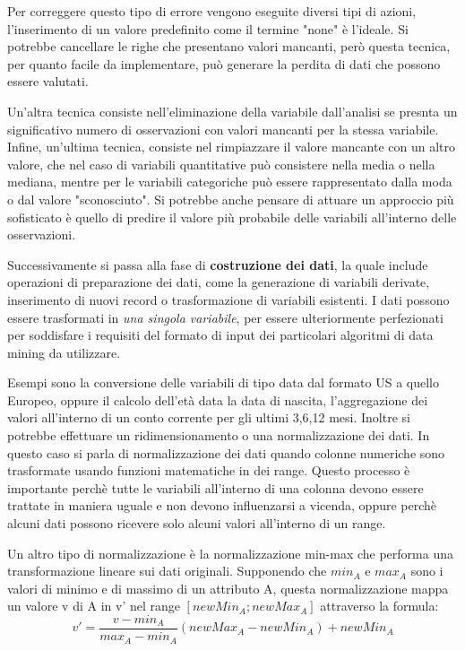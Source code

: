 \documentclass[a4paper]{extarticle}
\begin{document}
Per correggere questo tipo di errore vengono eseguite diversi tipi di azioni, l'inserimento di un valore predefinito come il termine "none" è l'ideale. Si potrebbe cancellare le righe che presentano valori mancanti, però questa tecnica, per quanto facile da implementare, può generare la perdita di dati che possono essere valutati. 

Un'altra tecnica consiste nell'eliminazione della variabile dall'analisi se presnta un significativo numero di osservazioni con valori mancanti per la stessa variabile. Infine, un'ultima tecnica, consiste nel rimpiazzare il valore mancante con un altro valore, che nel caso di variabili quantitative può consistere nella media o nella mediana, mentre per le variabili categoriche può essere rappresentato dalla moda o dal valore "sconosciuto". Si potrebbe anche pensare di attuare un approccio più sofisticato è quello di predire il valore più probabile delle variabili all'interno delle osservazioni.

Successivamente si passa alla fase di \textbf{costruzione dei dati}, la quale include operazioni di preparazione dei dati, come la generazione di variabili derivate, inserimento di nuovi record o trasformazione di variabili esistenti. I dati possono essere trasformati in \textit{una singola variabile}, per essere ulteriormente perfezionati per soddisfare i requisiti del formato di input dei particolari algoritmi di data mining da utilizzare.

Esempi sono la conversione delle variabili di tipo data dal formato US a quello Europeo, oppure il calcolo dell'età data la data di nascita, l'aggregazione dei valori all'interno di un conto corrente per gli ultimi 3,6,12 mesi. Inoltre si potrebbe effettuare un ridimensionamento o una normalizzazione dei dati. In questo caso si parla di normalizzazione dei dati quando colonne numeriche sono trasformate usando funzioni matematiche in dei range. Questo processo è importante perchè tutte le variabili all'interno di una colonna devono essere trattate in maniera uguale e non devono influenzarsi a vicenda, oppure perchè alcuni dati possono ricevere solo alcuni valori all'interno di un range.

Un altro tipo di normalizzazione è la normalizzazione min-max che performa una transformazione lineare sui dati originali. Supponendo che $ min_A$ e $max_A$ sono i valori di minimo e di massimo di un attributo A, questa normalizzazione mappa un valore v di A in v' nel range $[newMin_A; newMax_A]$ attraverso la formula:
\begin{equation}
v'= \dfrac{v-min_A}{max_A-min_A}(newMax_A - newMin_A)+newMin_A
\end{equation}
\end{document}
